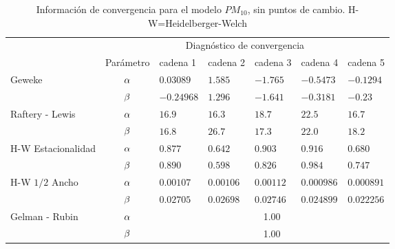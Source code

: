 \begin{table}[!h]
\centering
\begin{tabular}{|l|c|l|l|l|l|l|}
\hline
& \multicolumn{6}{|c|}{Diagnóstico de convergencia} \\
\cline{2-7}
& Parámetro & cadena 1  & cadena 2  & cadena 3 & cadena 4 & cadena 5	 \\
\hline \hline
\multirow{2}{2.5cm}{Geweke} & $\alpha$ & $0.03089$ & $1.585$ & $-1.765$ & $-0.5473$  & $-0.1294$\\ \cline{2-7}
& $\beta$& $-0.24968 $ & $1.296$ & $-1.641$ & $-0.3181$ & $-0.23$\\
  \cline{1-7}
\multirow{2}{2.5cm}{Raftery - Lewis} & $\alpha$ & $16.9$& $ 16.3$ & $18.7$ & $22.5 $ & $  16.7 $\\ \cline{2-7}
& $\beta$ & \multicolumn{1}{l|}{$16.8$} & $26.7$ & $ 17.3$ & $22.0$ & $18.2$ \\ \cline{1-7}
\multirow{2}{2.5cm}{H-W Estacionalidad} & $\alpha$ & $0.877$ & $0.642$ & $0.903$ & $0.916$ & $0.680$ \\ \cline{2-7}
&$\beta$ & \multicolumn{1}{l|}{$0.890$} & $0.598$ &  $ 0.826$ & $0.984$ & $0.747 $ \\ \cline{1-7}
\multirow{2}{2.5cm}{H-W $1/2$ Ancho} & $\alpha$ & $0.00107$ & $ 0.00106$ & $ 0.00112$ & $0.000986 $  & $ 0.000891  $  \\ \cline{2-7}
&$\beta$ & \multicolumn{1}{l|}{$0.02705  $} & $0.02698$ & $0.02746  $ & $0.024899$ & $0.022256$ \\ \cline{1-7}

\multirow{2}{2.5cm}{Gelman - Rubin} & $\alpha$ & \multicolumn{5}{|c|}{1.00}\\ \cline{2-7}
&$\beta$ &  \multicolumn{5}{|c|}{1.00} \\ \cline{1-7}



\end{tabular}
\caption{Información de convergencia para el modelo $PM_{10}$, sin puntos de cambio. H-W=Heidelberger-Welch}

\label{converpm10spc}
\end{table}






